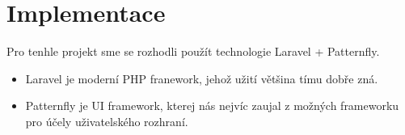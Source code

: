 \documentclass[11pt, a4paper, titlepage]{article}
\begin{document}
	\newpage
	\section*{Implementace}
	Pro tenhle projekt sme se rozhodli použít technologie Laravel + Patternfly.
	\begin{itemize}
	    \item Laravel je moderní PHP franework, jehož užití většina tímu dobře zná.
	    \item Patternfly je UI framework, kterej nás nejvíc zaujal z možných frameworku pro účely uživatelského rozhraní.
	\end{itemize}{}
\end{document}
